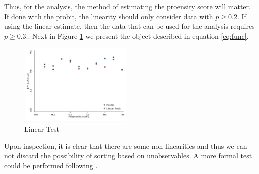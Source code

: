 \FloatBarrier
Thus, for the analysis, the method of estimating the proensity score will matter. If done with the probit, the linearity should only consider data with $p\geq0.2$. If using the linear estimate, then the data that can be used for the analysis requires $p\geq 0.3.$. Next in Figure \ref{fig:linTest} we present the object described in equation \eqref{eq:func}. 
\begin{figure}[htb]
    \centering
    \caption{\sc Linear Test}
    \label{fig:linTest}
    \includegraphics[width=0.48\textwidth]{Figures/Linear_Test.pdf}
\end{figure}
Upon inspection, it is clear that there are some non-linearities and thus we can not discard the possibility of sorting based on unobservables. A more formal test could be performed following \citet{Chen1999}. 